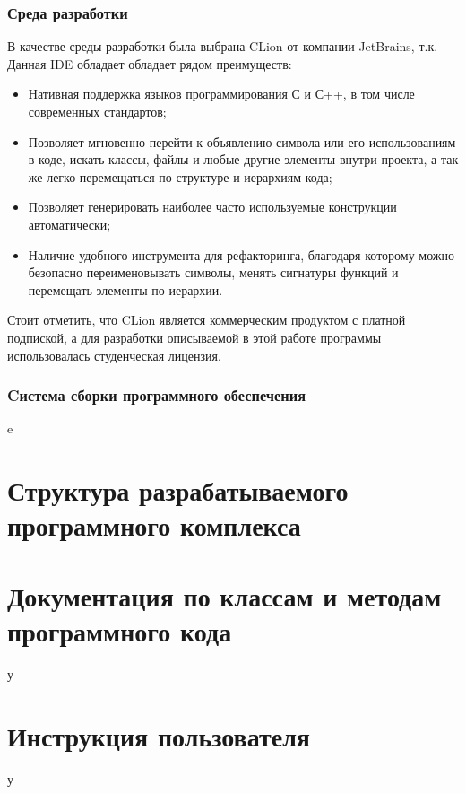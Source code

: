 \documentclass[a4paper,fontsize=14bp]{article}
\begin{document}
    \subsubsection{Среда разработки} 
      В качестве среды разработки была выбрана CLion от компании JetBrains, т.к. 
      Данная IDE обладает обладает рядом преимуществ:
      \begin{itemize}
        \item Нативная поддержка языков программирования С и С++, в том числе современных стандартов;
        \item Позволяет мгновенно перейти к объявлению символа или его использованиям в коде,
        искать классы, файлы и любые другие элементы внутри проекта, а так же легко перемещаться по
        структуре и иерархиям кода;
        \item Позволяет генерировать наиболее часто используемые конструкции автоматически;
        \item Наличие удобного инструмента для рефакторинга, благодаря которому можно безопасно
        переименовывать символы, менять сигнатуры функций и перемещать элементы по иерархии.
      \end{itemize}
      Стоит отметить, что CLion является коммерческим продуктом с платной подпиской, а для 
      разработки описываемой в этой работе программы использовалась студенческая лицензия.

    
    


    \subsubsection{Cистема сборки программного обеспечения} e



\section{Структура разрабатываемого программного комплекса}



\section{Документация по классам и методам программного кода}
у


\section{Инструкция пользователя}
у
\end{document}
